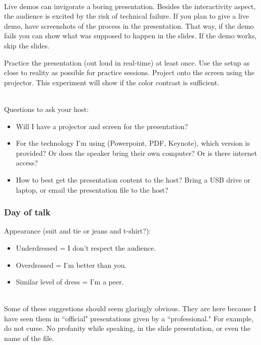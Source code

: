 \ \\


Live demos can invigorate a boring presentation. Besides the interactivity aspect, the audience is excited by the risk of technical failure. 
If you plan to give a live demo, have screenshots of the process in the presentation. That way, if the demo fails you can show what was supposed to happen in the slides. If the demo works, skip the slides.


Practice the presentation (out loud in real-time) at least once.
Use the setup as close to reality as possible for practice sessions. Project onto the screen using the projector. This experiment will show if the color contrast is sufficient.

\ \\

Questions to ask your host:
\begin{itemize}
    \item Will I have a projector and screen for the presentation?
    \item For the technology I'm using (Powerpoint, PDF, Keynote), which version is provided? 
    Or does the speaker bring their own computer? 
    Or is there internet access?
    \item How to best get the presentation content to the host? Bring a USB drive or laptop, or email the presentation file to the host?
\end{itemize}


\subsubsection*{Day of talk}

Appearance (suit and tie or jeans and t-shirt?):
\begin{itemize}
    \item Underdressed = I don't respect the audience.
    \item Overdressed = I'm better than you.
    \item Similar level of dress = I'm a peer.
\end{itemize}

\ \\

Some of these suggestions should seem glaringly obvious. They are here because I have seen them in ``official" presentations given by a ``professional." For example, do not curse. No profanity while speaking, in the slide presentation, or even the name of the file.

